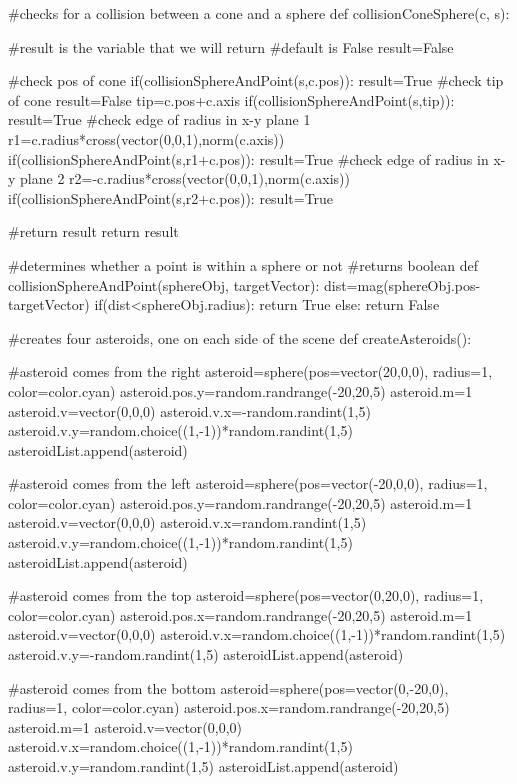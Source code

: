 \begin{enumerate}
\begin{vpythonblock}
#checks for a collision between a cone and a sphere
def collisionConeSphere(c, s):

    #result is the variable that we will return
    #default is False
    result=False

    #check pos of cone
    if(collisionSphereAndPoint(s,c.pos)):
        result=True
    #check tip of cone
    result=False
    tip=c.pos+c.axis
    if(collisionSphereAndPoint(s,tip)):
        result=True
    #check edge of radius in x-y plane 1
    r1=c.radius*cross(vector(0,0,1),norm(c.axis))
    if(collisionSphereAndPoint(s,r1+c.pos)):
        result=True
    #check edge of radius in x-y plane 2
    r2=-c.radius*cross(vector(0,0,1),norm(c.axis))
    if(collisionSphereAndPoint(s,r2+c.pos)):
        result=True

    #return result
    return result

#determines whether a point is within a sphere or not
#returns boolean
def collisionSphereAndPoint(sphereObj, targetVector):
    dist=mag(sphereObj.pos-targetVector)
    if(dist<sphereObj.radius):
        return True
    else:
        return False
    
#creates four asteroids, one on each side of the scene
def createAsteroids():

    #asteroid comes from the right
    asteroid=sphere(pos=vector(20,0,0), radius=1, color=color.cyan)
    asteroid.pos.y=random.randrange(-20,20,5)
    asteroid.m=1
    asteroid.v=vector(0,0,0)
    asteroid.v.x=-random.randint(1,5)
    asteroid.v.y=random.choice((1,-1))*random.randint(1,5)
    asteroidList.append(asteroid)

    #asteroid comes from the left
    asteroid=sphere(pos=vector(-20,0,0), radius=1, color=color.cyan)
    asteroid.pos.y=random.randrange(-20,20,5)
    asteroid.m=1
    asteroid.v=vector(0,0,0)
    asteroid.v.x=random.randint(1,5)
    asteroid.v.y=random.choice((1,-1))*random.randint(1,5)
    asteroidList.append(asteroid)

    #asteroid comes from the top
    asteroid=sphere(pos=vector(0,20,0), radius=1, color=color.cyan)
    asteroid.pos.x=random.randrange(-20,20,5)
    asteroid.m=1
    asteroid.v=vector(0,0,0)
    asteroid.v.x=random.choice((1,-1))*random.randint(1,5)
    asteroid.v.y=-random.randint(1,5)
    asteroidList.append(asteroid)

    #asteroid comes from the bottom
    asteroid=sphere(pos=vector(0,-20,0), radius=1, color=color.cyan)
    asteroid.pos.x=random.randrange(-20,20,5)
    asteroid.m=1
    asteroid.v=vector(0,0,0)
    asteroid.v.x=random.choice((1,-1))*random.randint(1,5)
    asteroid.v.y=random.randint(1,5)
    asteroidList.append(asteroid)


\end{vpythonblock}
\end{enumerate}
